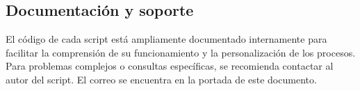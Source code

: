 \documentclass[a4paper,11pt]{refart}
\begin{document}
\subsection{Documentación y soporte}

El código de cada script está ampliamente documentado internamente para facilitar la comprensión de su funcionamiento y la personalización de los procesos. Para problemas complejos o consultas específicas, se recomienda contactar al autor del script. El correo se encuentra en la portada de este documento.



\end{document}
